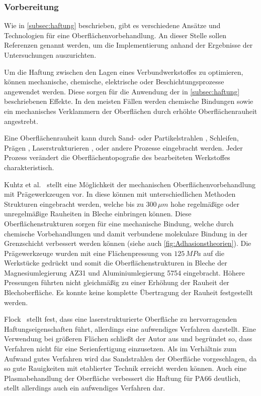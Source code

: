 \subsubsection{Vorbereitung}

Wie in \autoref{subsec:haftung} beschrieben, gibt es verschiedene Ansätze und Technologien für eine Oberflächenvorbehandlung.
An dieser Stelle sollen Referenzen genannt werden, um die Implementierung anhand der Ergebnisse der Untersuchungen auszurichten.

Um die Haftung zwischen den Lagen eines Verbundwerkstoffes zu optimieren, können mechanische, chemische, elektrische oder Beschichtungsprozesse angewendet werden.
Diese sorgen für die Anwendung der in \autoref{subsec:haftung} beschriebenen Effekte.
In den meisten Fällen werden chemische Bindungen sowie ein mechanisches Verklammern der Oberflächen durch erhöhte Oberflächenrauheit angestrebt.

Eine Oberflächenrauheit kann durch Sand- oder Partikelstrahlen \cite{Dlugosch2016}, Schleifen, Prägen \cite{Wiedemann2017}, Laserstrukturieren \cite{Flock2012}, oder andere Prozesse eingebracht werden.
Jeder Prozess verändert die Oberflächentopografie des bearbeiteten Werkstoffes charakteristisch.

Kuhtz et al.~\cite{Kuhtz2019} stellt eine Möglichkeit der mechanischen Oberflächenvorbehandlung mit Prägewerkzeugen vor.
In diese können mit unterschiedlichen Methoden Strukturen eingebracht werden, welche bis zu $300\, \mu m$ hohe regelmäßige oder unregelmäßige Rauheiten in Bleche einbringen können.
Diese Oberflächenstrukturen sorgen für eine mechanische Bindung, welche durch chemische Vorbehandlungen und damit verbundene molekulare Bindung in der Grenzschicht verbessert werden können (siehe auch \autoref{fig:Adhasionstheorien}).
Die Prägewerkzeuge wurden mit eine Flächenpressung von $125\, MPa$ auf die Werkstücke gedrückt und somit die Oberflächenstrukturen in Bleche der Magnesiumlegierung AZ31 und Aluminiumlegierung  5754 eingebracht.
Höhere Pressungen führten nicht gleichmäßig zu einer Erhöhung der Rauheit der Blechoberfläche.
Es konnte keine komplette Übertragung der Rauheit festgestellt werden.

Flock~\cite{Flock2012} stellt fest, dass eine laserstrukturierte Oberfläche zu hervorragenden Haftungseigenschaften führt, allerdings eine aufwendiges Verfahren darstellt.
Eine Verwendung bei größeren Flächen schließt der Autor aus und begründet so, dass Verfahren nicht für eine Serienfertigung einzusetzen.
Als im Verhältnis zum Aufwand gutes Verfahren wird das Sandstrahlen der Oberfläche vorgeschlagen, da so gute Rauigkeiten mit etablierter Technik erreicht werden können.
Auch eine Plasmabehandlung der Oberfläche verbessert die Haftung für PA66 deutlich, stellt allerdings auch ein aufwendiges Verfahren dar.


